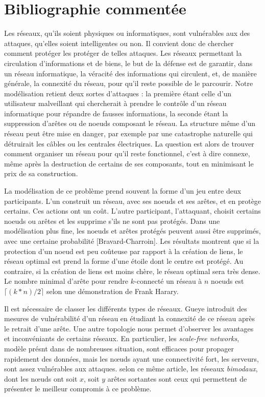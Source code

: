 \documentclass[11pt,a4paper]{article}
\begin{document}
\section{Bibliographie commentée}




	Les réseaux, qu'ils soient physiques ou informatiques, sont vulnérables aux des attaques, qu'elles soient intelligentes ou non. Il convient donc de chercher comment protéger les protéger de telles attaques. Les réseaux permettant la circulation d'informations et de biens, le but de la défense est de garantir, dans un réseau informatique, la véracité des informations qui circulent, et, de manière générale, la connexité du réseau, pour qu'il reste possible de le parcourir. Notre modélisation retient deux sortes d'attaques : la première étant celle d'un utilisateur malveillant qui chercherait à prendre le contrôle d'un réseau informatique pour répandre de fausses informations, la seconde étant la suppression d'arêtes ou de noeuds composant le réseau. La structure même d'un réseau peut être mise en danger, par exemple par une catastrophe naturelle qui détruirait les câbles ou les centrales électriques. La question est alors de trouver comment organiser un réseau pour qu'il reste fonctionnel, c'est à dire connexe, même après la destruction de certains de ses composants, tout en minimisant le prix de sa construction. 
	
	La modélisation de ce problème prend souvent la forme d'un jeu\cite{goyal14} entre deux participants. L'un construit un réseau, avec ses noeuds et ses arêtes, et en protège certains. Ces actions ont un coût. L'autre participant, l'attaquant, choisit certains noeuds ou arêtes et les supprime s'ils ne sont pas protégés. Dans une modélisation plus fine, les noeuds et arêtes protégés peuvent aussi être supprimés, avec une certaine probabilité [Bravard-Charroin]. Les résultats montrent que si la protection d'un noeud est peu coûteuse par rapport à la création de liens, le réseau optimal est prend la forme d'une étoile dont le centre est protégé.  Au contraire, si la création de liens est moins chère, le réseau optimal sera très dense\cite{goyal14}. Le nombre minimal d'arête pour rendre $k$-connecté un réseau à $n$ noeuds est $\lceil(k * n) / 2\rceil$ selon une démonstration de Frank Harary\cite{harary}.

	
	Il est nécessaire de classer les différents types de réseaux. Gueye\cite{gueye} introduit des mesures de vulnérabilité d'un réseau en étudiant la connexité de ce réseau après le retrait d'une arête. Une autre topologie\cite{XXX} nous permet d'observer les avantages et inconvéniants de certains réseaux. En particulier, les \emph{scale-free networks}, modèle présnt dans de nombreuses situation, sont efficaces pour propager rapidement des données, mais les n{\oe}uds ayant une connectivité fort, les serveurs, sont assez vulnérables aux attaques. selon ce même article, les réseaux \emph{bimodaux}, dont les n{\oe}uds ont soit $x$, soit $y$ arêtes sortantes sont ceux qui permettent de présenter le meilleur compromis à ce problème.
\end{document}
